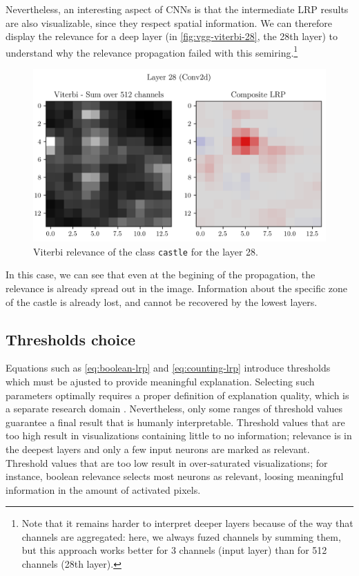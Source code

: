 \documentclass[twocolumn]{../cs-classes/cs-classes}
\newcommand*{\1}{\digitsbb{1}}
\newcommand*{\0}{\digitsbb{0}}
\begin{document}
Nevertheless, an interesting aspect of CNNs is that the intermediate LRP results are also visualizable, since they respect spatial information. We can therefore display the relevance for a deep layer (in \autoref{fig:vgg-viterbi-28}, the 28th layer) to understand why the relevance propagation failed with this semiring.\footnote{Note that it remains harder to interpret deeper layers because of the way that channels are aggregated: here, we always fuzed channels by summing them, but this approach works better for 3 channels (input layer) than for 512 channels (28th layer).}
\begin{figure}[H]
    \centering
    \includegraphics[width=\linewidth]{vgg-viterbi-28.png}
    \caption{Viterbi relevance of the class \texttt{castle} for the layer 28.}
    \label{fig:vgg-viterbi-28}
\end{figure}
In this case, we can see that even at the begining of the propagation, the relevance is already spread out in the image. Information about the specific zone of the castle is already lost, and cannot be recovered by the lowest layers.

\subsection{Thresholds choice}
\label{sec:thresholds-choice}
Equations such as \ref{eq:boolean-lrp} and \ref{eq:counting-lrp} introduce thresholds which must be ajusted to provide meaningful explanation. Selecting such parameters optimally requires a proper definition of explanation quality, which is a separate research domain \cite{samek2016evaluating}. Nevertheless, only some ranges of threshold values guarantee a final result that is humanly interpretable. Threshold values that are too high result in visualizations containing little to no information; relevance is  in the deepest layers and only a few input neurons are marked as relevant. Threshold values that are too low result in over-saturated visualizations; for instance, boolean relevance selects most neurons as relevant, loosing meaningful information in the amount of activated pixels.
\end{document}
